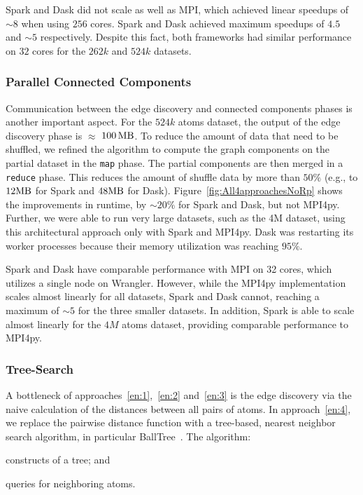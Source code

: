 Spark and Dask did not scale as well as MPI, which achieved linear speedups of
$\sim8$ when using $256$ cores. Spark and Dask achieved maximum speedups of
$4.5$ and $\sim5$ respectively. Despite this fact, both frameworks had similar
performance on $32$ cores for the $262k$ and $524k$ datasets.

\subsubsection*{Parallel Connected Components}

Communication between the edge discovery and connected components phases is
another important aspect. For the $524k$ atoms dataset, the output of the edge
discovery phase is $\approx$ $100\,\textup{MB}$. To reduce the amount of data
that need to be shuffled, we refined the algorithm to compute the graph
components on the partial dataset in the \texttt{map} phase. The partial
components are then merged in a \texttt{reduce} phase. This reduces the amount
of shuffle data by more than $50\%$ (e.g., to $12\textup{MB}$ for Spark and
$48\textup{MB}$ for Dask). Figure~\ref{fig:All4approachesNoRp} shows the
improvements in runtime, by $\sim20\%$ for Spark and Dask, but not MPI4py.
Further, we were able to run very large datasets, such as the 4M dataset, using
this architectural approach only with Spark and MPI4py. Dask was restarting its
worker processes because their memory utilization was reaching $95\%$.

Spark and Dask have comparable performance with MPI on 32 cores, which utilizes
a single node on Wrangler. However, while the MPI4py implementation scales
almost linearly for all datasets, Spark and Dask cannot, reaching a maximum of
$\sim5$ for the three smaller datasets. In addition, Spark is able to scale
almost linearly for the $4M$ atoms dataset, providing comparable performance to
MPI4py.

\subsubsection*{Tree-Search}

A bottleneck of approaches~\ref{en:1},~\ref{en:2} and~\ref{en:3} is the edge
discovery via the naive calculation of the distances between all pairs of atoms.
In approach~\ref{en:4}, we replace the pairwise distance function with a
tree-based, nearest neighbor search algorithm, in particular
BallTree~\cite{omohundro89five}. The algorithm:
\begin{inparaenum}
    \item constructs of a tree; and
    \item queries for neighboring atoms.
\end{inparaenum}

